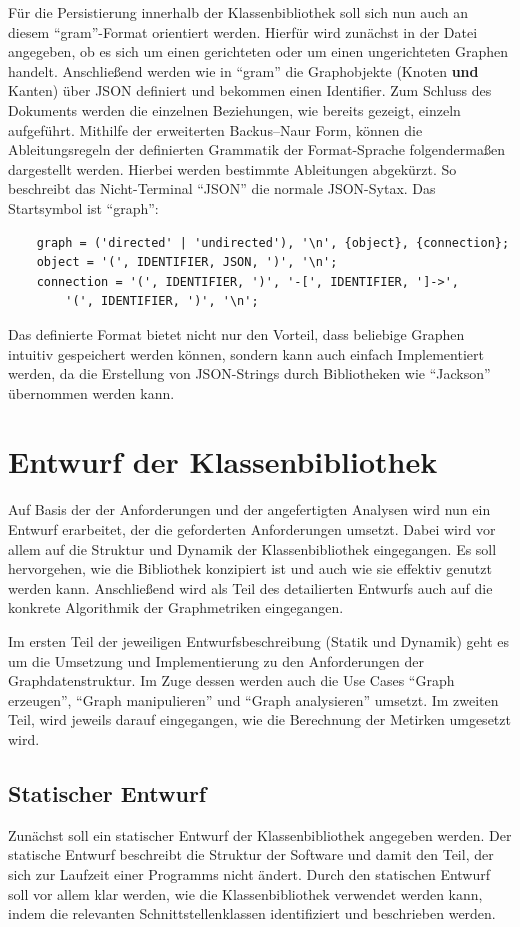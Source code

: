 \documentclass[a4paper,12pt,ngerman,chapterprefix=false,listof=totoc,bibliography=totoc]{scrreprt}
\begin{document}
{{{Für die Persistierung innerhalb der Klassenbibliothek soll sich nun auch an diesem "`gram"'-Format orientiert werden. Hierfür wird zunächst in der Datei angegeben, ob es sich um einen gerichteten oder um einen ungerichteten Graphen handelt. Anschließend werden wie in "`gram"' die Graphobjekte (Knoten \textbf{und} Kanten) über JSON definiert und bekommen einen Identifier. Zum Schluss des Dokuments werden die einzelnen Beziehungen, wie bereits gezeigt, einzeln aufgeführt. Mithilfe der erweiterten Backus–Naur Form, können die Ableitungsregeln der definierten Grammatik der Format-Sprache folgendermaßen dargestellt werden. Hierbei werden bestimmte Ableitungen abgekürzt. So beschreibt das Nicht-Terminal "`JSON"' die normale JSON-Sytax. Das Startsymbol ist "`graph"':
\begin{verbatim}
	graph = ('directed' | 'undirected'), '\n', {object}, {connection};
	object = '(', IDENTIFIER, JSON, ')', '\n';
	connection = '(', IDENTIFIER, ')', '-[', IDENTIFIER, ']->', 
		'(', IDENTIFIER, ')', '\n';
\end{verbatim}
Das definierte Format bietet nicht nur den Vorteil, dass beliebige Graphen intuitiv gespeichert werden können, sondern kann auch einfach Implementiert werden, da die Erstellung von JSON-Strings durch Bibliotheken wie "`Jackson"' übernommen werden kann.
}
\section{Entwurf der Klassenbibliothek}
{
Auf Basis der der Anforderungen und der angefertigten Analysen wird nun ein Entwurf erarbeitet, der die geforderten Anforderungen umsetzt. Dabei wird vor allem auf die Struktur und Dynamik der Klassenbibliothek eingegangen. Es soll hervorgehen, wie die Bibliothek konzipiert ist und auch wie sie effektiv genutzt werden kann. Anschließend wird als Teil des detailierten Entwurfs auch auf die konkrete Algorithmik der Graphmetriken eingegangen. \cite{balzert_lehrbuch_2011}

Im ersten Teil der jeweiligen Entwurfsbeschreibung (Statik und Dynamik) geht es um die Umsetzung und Implementierung zu den Anforderungen der Graphdatenstruktur. Im Zuge dessen werden auch die Use Cases "`Graph erzeugen"', "`Graph manipulieren"' und "`Graph analysieren"' umsetzt. Im zweiten Teil, wird jeweils darauf eingegangen, wie die Berechnung der Metirken umgesetzt wird.
}
\subsection{Statischer Entwurf}
{
Zunächst soll ein statischer Entwurf der Klassenbibliothek angegeben werden. Der statische Entwurf beschreibt die Struktur der Software und damit den Teil, der sich zur Laufzeit einer Programms nicht ändert. Durch den statischen Entwurf soll vor allem klar werden, wie die Klassenbibliothek verwendet werden kann, indem die relevanten Schnittstellenklassen identifiziert und beschrieben werden.

}}}
\end{document}
